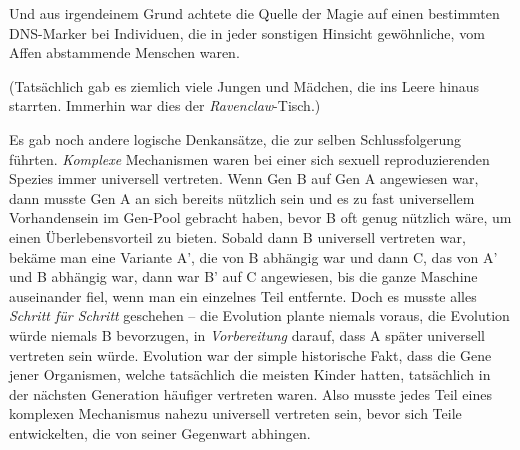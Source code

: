 Und aus irgendeinem Grund achtete die Quelle der Magie auf einen bestimmten DNS-Marker bei Individuen, die in jeder sonstigen Hinsicht gewöhnliche, vom Affen abstammende Menschen waren.

(Tatsächlich gab es ziemlich viele Jungen und Mädchen, die ins Leere hinaus starrten. Immerhin war dies der \emph{Ravenclaw}-Tisch.)

Es gab noch andere logische Denkansätze, die zur selben Schlussfolgerung führten. \emph{Komplexe} Mechanismen waren bei einer sich sexuell reproduzierenden Spezies immer universell vertreten. Wenn Gen B auf Gen A angewiesen war, dann musste Gen A an sich bereits nützlich sein und es zu fast universellem Vorhandensein im Gen-Pool gebracht haben, bevor B oft genug nützlich wäre, um einen Überlebensvorteil zu bieten. Sobald dann B universell vertreten war, bekäme man eine Variante A', die von B abhängig war und dann C, das von A' und B abhängig war, dann war B' auf C angewiesen, bis die ganze Maschine auseinander fiel, wenn man ein einzelnes Teil entfernte. Doch es musste alles \emph{Schritt für Schritt} geschehen -- die Evolution plante niemals voraus, die Evolution würde niemals B bevorzugen, in \emph{Vorbereitung} darauf, dass A später universell vertreten sein würde. Evolution war der simple historische Fakt, dass die Gene jener Organismen, welche tatsächlich die meisten Kinder hatten, tatsächlich in der nächsten Generation häufiger vertreten waren. Also musste jedes Teil eines komplexen Mechanismus nahezu universell vertreten sein, bevor sich Teile entwickelten, die von seiner Gegenwart abhingen.


